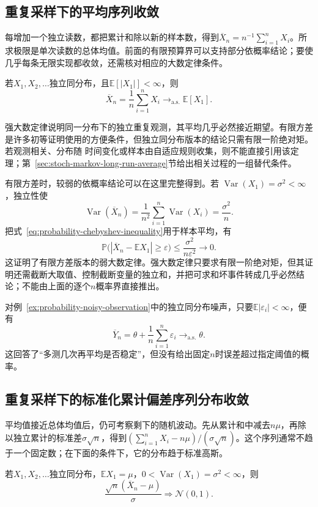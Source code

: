 \subsection{重复采样下的平均序列收敛}

每增加一个独立读数，都把累计和除以新的样本数，得到\(\overline X_n=n^{-1}\sum_{i=1}^nX_i\)。所求极限是单次读数的总体均值。前面的有限预算界可以支持部分依概率结论；要使几乎每条无限实现都收敛，还需核对相应的大数定律条件。
\label{sec:rv-aggregate-limits}
\begin{theorem}[强大数定律]
\label{thm:probability-strong-law-large-numbers}
若\(X_1,X_2,\ldots\)独立同分布，且\(\mathbb{E}[|X_1|]<\infty\)，则
\[ \overline{X}_n
  =\frac{1}{n}\sum_{i=1}^{n}X_i\to_{\mathrm{a.s.}}\mathbb{E}[X_1]. \]
\end{theorem}

强大数定律说明同一分布下的独立重复观测，其平均几乎必然接近期望。有限方差是许多初等证明使用的方便条件，但独立同分布版本的结论只需有限一阶绝对矩。若观测相关、分布随
时间变化或样本由自适应规则收集，则不能直接引用该定理；第~\ref{sec:stoch-markov-long-run-average}节给出相关过程的一组替代条件。

有限方差时，较弱的依概率结论可以在这里完整得到。若
\(\operatorname{Var}(X_1)=\sigma^2<\infty\)，独立性使
\[
  \operatorname{Var}(\overline{X}_n)
  =\frac{1}{n^2}\sum_{i=1}^{n}\operatorname{Var}(X_i)
  =\frac{\sigma^2}{n}.
\]
把式~\eqref{eq:probability-chebyshev-inequality}用于样本平均，有
\[
  \mathbb{P}\bigl(
    |\overline{X}_n-\mathbb{E}X_1|\geq\varepsilon
  \bigr)
  \leq\frac{\sigma^2}{n\varepsilon^2}\to0.
\]
这证明了有限方差版本的弱大数定律。强大数定律只要求有限一阶绝对矩，但其证明还需截断大取值、控制截断变量的独立和，并把可求和坏事件转成几乎必然结论；不能由上面的逐个\(n\)概率界直接推出。

对例~\ref{ex:probability-noisy-observation}中的独立同分布噪声，只要\(\mathbb{E}|\varepsilon_i|<\infty\)，便有
\[ \overline{Y}_n
  =\theta+\frac{1}{n}\sum_{i=1}^{n}\varepsilon_i\to_{\mathrm{a.s.}}\theta. \]
这回答了“多测几次再平均是否稳定”，但没有给出固定\(n\)时误差超过指定阈值的概率。

\subsection{重复采样下的标准化累计偏差序列分布收敛}

平均值接近总体均值后，仍可考察剩下的随机波动。先从累计和中减去\(n\mu\)，再除以独立累计的标准差\(\sigma\sqrt n\)，得到\((\sum_{i=1}^nX_i-n\mu)/(\sigma\sqrt n)\)。这个序列通常不趋于一个固定数；在下面的条件下，它的分布趋于标准高斯。
\label{sec:rv-standardized-sum-limits}
\begin{theorem}
\label{thm:probability-iid-central-limit}
若\(X_1,X_2,\ldots\)独立同分布，\(\mathbb{E}X_1=\mu\)，\(0<\operatorname{Var}(X_1)=\sigma^2<\infty\)，则
\[ \frac{\sqrt{n}(\overline{X}_n-\mu)}{\sigma}
  \Rightarrow\mathcal{N}(0,1). \]
\end{theorem}

